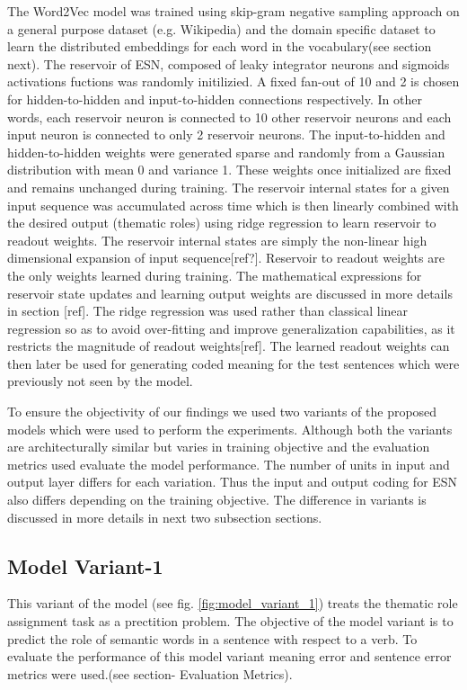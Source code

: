The Word2Vec model was trained using skip-gram negative sampling approach on a general purpose dataset (e.g. Wikipedia) and the domain specific dataset to learn the distributed embeddings for each word in the vocabulary(see section next). The reservoir of ESN, composed of leaky integrator neurons and sigmoids activations fuctions was randomly initilizied. A fixed fan-out of 10 and 2 is chosen for hidden-to-hidden and input-to-hidden connections respectively. In other words, each reservoir neuron is connected to 10 other reservoir neurons and each input neuron is connected to only 2 reservoir neurons. The input-to-hidden and hidden-to-hidden weights were generated sparse and randomly from a Gaussian distribution with mean 0 and variance 1. These weights once initialized are fixed and remains unchanged during training. The reservoir internal states for a given input sequence was accumulated across time which is then linearly combined with the desired output (thematic roles) using ridge regression to learn reservoir to readout weights. The reservoir internal states are simply the non-linear high dimensional expansion of input sequence[ref?]. Reservoir to readout weights are the only weights learned during training. The mathematical expressions for reservoir state updates and learning output weights are discussed in more details in section [ref]. The ridge regression was used rather than classical linear regression so as to avoid over-fitting and improve generalization capabilities, as it restricts the magnitude of readout weights[ref]. The learned readout weights can then later be used for generating coded meaning for the test sentences which were previously not seen by the model.

To ensure the objectivity of our findings we used two variants of the proposed models which were used to perform the experiments. Although both the variants are architecturally similar but varies in training objective and the evaluation metrics used evaluate the model performance. The number of units in input and output layer differs for each variation. Thus the input and output coding for ESN also differs depending on the training objective. The difference in variants is discussed in more details in next two subsection sections.

\subsection{Model Variant-1}

This variant of the model (see fig. \ref{fig:model_variant_1}) treats the thematic role assignment task as a prectition problem. The objective of the model variant is to predict the role of semantic words in a sentence with respect to a verb. To evaluate the performance of this model variant meaning error and sentence error metrics were used.(see section- Evaluation Metrics).

